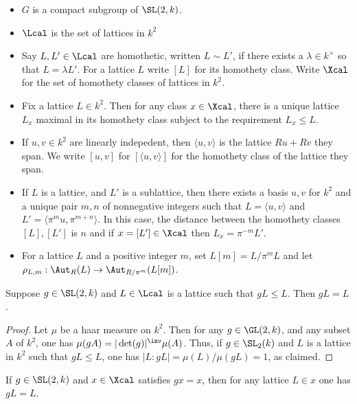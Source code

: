 

\begin{itemize}
    \item $G$ is a compact subgroup of $\SL(2,k)$.
    \item $\Lcal$ is the set of lattices in $k^2$
    \item Say $L,L' \in \Lcal$ are homothetic, written $L \sim L'$, if there exists a $\lambda \in k^\times$ so that $L = \lambda L'$. For a lattice $L$ write $[L]$ for its homothety class.  Write $\Xcal$ for the set of homothety classes of lattices in $k^2$.
    \item Fix a lattice $L \in k^2$. Then for any class $x \in \Xcal$, there is a unique lattice $L_x$ maximal in its homothety class subject to the requirement $L_x \leq L$.
    \item If $u,v \in k^2$ are linearly indepedent, then $\langle u,v \rangle$ is the lattice $Ru+Rv$ they span. We write $[u,v]$ for $[\langle u,v \rangle]$ for the homothety class of the lattice they span.
    \item If $L$ is a lattice, and $L'$ is a sublattice, then there exists a basis $u,v$ for $k^2$ and a unique pair $m,n$ of nonnegative integers such that $L=\langle u, v \rangle$ and $L' = \langle \pi^m u, \pi^{m+n} \rangle$. In this case, the distance between the homothety classes $[L],[L']$ is $n$ and if $x = [L'] \in \Xcal$ then $L_x = \pi^{-m}L'$.
    \item For a lattice $L$ and a positive integer $m$, set $L[m]= L/\pi^m L$ and let $\rho_{L,m}: \Aut_R(L) \to \Aut_{R/\pi^m}(L[m])$.
\end{itemize}

\begin{lemma}
    Suppose $g\in \SL(2,k)$ and $L \in \Lcal$ is a lattice such that $gL\leq L$. Then $gL=L$.
\end{lemma}
\begin{proof}
    Let $\mu$ be a haar measure on $k^2$. Then for any $g \in \GL(2,k)$, and any subset $A$  of $k^2$, one has $\mu (gA) =|\det (g)|^\inv \mu(A)$. Thus, if $g \in \SL_2(k)$ and $L$ is a lattice in $k^2$ such that $gL\leq L$, one has $|L:gL|=\mu(L)/\mu(gL) = 1$, as claimed.
\end{proof}
\begin{corollary}
    If $g \in \SL(2,k)$ and $x\in \Xcal$ satisfies $gx=x$, then for any lattice $L \in x$ one has $gL=L$.
\end{corollary}

